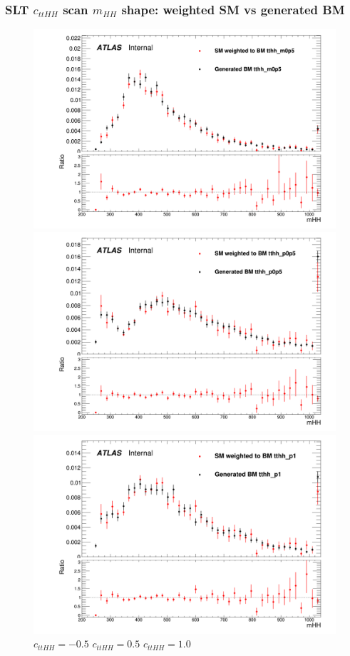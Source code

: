 \documentclass[twoside,11pt]{beamer}
\begin{document}
\begin{frame}
    \frametitle{SLT $c_{ttHH}$ scan $m_{HH}$  shape: weighted SM vs generated BM}
\begin{figure}
    \includegraphics[width=.32\textwidth]{figures/Method_B_all_latest/BMtthh_m0p5h_mHH.png}
    \includegraphics[width=.32\textwidth]{figures/Method_B_all_latest/BMtthh_p0p5h_mHH.png}
    \includegraphics[width=.32\textwidth]{figures/Method_B_all_latest/BMtthh_p1h_mHH.png}
    $c_{ttHH} = -0.5$ \hspace{5em} $c_{ttHH} = 0.5$\hspace{5em} $c_{ttHH} = 1.0$    
\end{figure}

\end{frame}   
\end{document}
